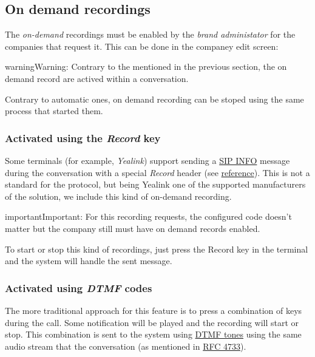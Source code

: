 \documentclass[letterpaper,10pt,english]{sphinxmanual}
\begin{document}
\subsection{On demand recordings}
\label{company/call_recording:on-demand-recordings}
The \emph{on-demand} recordings must be enabled by the \emph{brand administator} for the
companies that request it. This can be done in the companey edit screen:

\noindent{}

\begin{notice}{warning}{Warning:}
Contrary to the {\hyperref[platform/services:services]{}} mentioned in the
previous section, the on demand record are actived within a conversation.
\end{notice}

Contrary to automatic ones, on demand recording can be stoped using the same
process that started them.


\subsubsection{Activated using the \emph{Record} key}
\label{company/call_recording:activated-using-the-record-key}
Some terminals (for example, \emph{Yealink}) support sending a \href{https://tools.ietf.org/html/rfc6086}{SIP INFO} message during the conversation with a
special \emph{Record} header (see \href{http://www.yealink.com/Upload/document/UsingCallRecordingFeatureonYealinkPhones/UsingCallRecordingFeatureonYealinkSIPT2XPphonesRev\_610-20561729764.pdf}{reference}).
This is not a standard for the protocol, but being Yealink one of the supported
manufacturers of the solution, we include this kind of on-demand recording.

\begin{notice}{important}{Important:}
For this recording requests, the configured code doesn't matter
but the company still must have on demand records enabled.
\end{notice}

To start or stop this kind of recordings, just press the Record key in the
terminal and the system will handle the sent message.


\subsubsection{Activated using \emph{DTMF} codes}
\label{company/call_recording:activated-using-dtmf-codes}
The more traditional approach for this feature is to press a combination of
keys during the call. Some notification will be played and the recording will
start or stop. This combination is sent to the system using \href{https://es.wikipedia.org/wiki/Marcaci\%C3\%B3n\_por\_tonos}{DTMF tones} using the same audio
stream that the conversation (as mentioned in \href{https://tools.ietf.org/html/rfc4733}{RFC 4733}).
\end{document}
